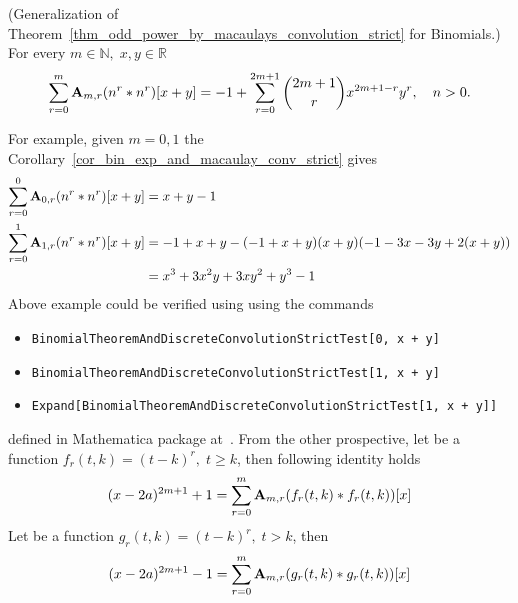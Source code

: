 \begin{cor}
    \label{cor_bin_exp_and_macaulay_conv_strict}
    (Generalization of Theorem~\ref{thm_odd_power_by_macaulays_convolution_strict} for Binomials.)
    For every $m\in\mathbb{N}, \; x,y\in\mathbb{R}$
    \begin{equation*}
        \sum_{r=0}^{m} {\mathbf{A}} \sb{m,r} (n \sp{r} \ast n \sp{r}) [x+y]
        =
        -1 + \sum_{r=0}^{2m+1} \binom{2m+1}{r} x^{2m+1-r} y^r, \quad n > 0.
    \end{equation*}
\end{cor}
For example, given $m=0,1$ the Corollary~\ref{cor_bin_exp_and_macaulay_conv_strict} gives
\begin{equation*}
    \begin{split}
        \sum_{r=0}^{0} {\mathbf{A}} \sb{0,r} (n \sp{r} \ast n \sp{r}) [x+y]
        &= x + y - 1 \\
        \sum_{r=0}^{1} {\mathbf{A}} \sb{1,r} (n \sp{r} \ast n \sp{r}) [x+y]
        &= -1 + x + y - (-1 + x + y) (x + y) (-1 - 3 x - 3 y + 2 (x + y)) \\
        &= x^3 + 3 x^2 y + 3 x y^2 + y^3 - 1
    \end{split}
\end{equation*}
Above example could be verified using using the commands
\begin{itemize}
    \item \texttt{BinomialTheoremAndDiscreteConvolutionStrictTest[0, x + y]}
    \item \texttt{BinomialTheoremAndDiscreteConvolutionStrictTest[1, x + y]}
    \item \texttt{Expand[BinomialTheoremAndDiscreteConvolutionStrictTest[1, x + y]]}
\end{itemize}
defined in Mathematica package at~\cite{PK22Source}.
From the other prospective, let be a function $f_r(t,k) = (t-k)^r, \; t \geq k$, then following identity holds
\begin{equation}
(x-2a)
    ^{2m+1} + 1 =\sum_{r=0}^{m} {\mathbf{A}} \sb{m,r} (f_r(t,k) \ast f_r(t,k))[x]
    \label{eq:parametric-identity}
\end{equation}
Let be a function $g_r(t,k) = (t-k)^r, \; t > k$, then
\begin{equation}
(x-2a)
    ^{2m+1} - 1 =\sum_{r=0}^{m} {\mathbf{A}} \sb{m,r} (g_r(t,k) \ast g_r(t,k))[x]
    \label{eq:parametric-identity-strict}
\end{equation}

